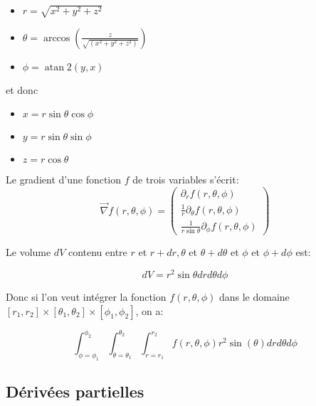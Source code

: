 \begin{itemize}
    \item $r=\sqrt{x^2+y^2+z^2}$
    \item $\theta=\arccos \left(\frac{z}{\sqrt{\left(x^2+y^2+z^2\right)}}\right)$
    \item $\phi=\operatorname{atan} 2(y, x)$
\end{itemize}
et donc 
\begin{itemize}
    \item $x=r \sin \theta \cos \phi$
    \item $y=r \sin \theta \sin \phi$
    \item $z=r \cos \theta$
\end{itemize}

Le gradient d'une fonction $f$ de trois variables s'écrit:
$$
\vec{\nabla} f(r, \theta, \phi)=\left(\begin{array}{c}
\partial_r f(r, \theta, \phi) \\
\frac{1}{r} \partial_\theta f(r, \theta, \phi) \\
\frac{1}{r \sin \theta} \partial_\phi f(r, \theta, \phi)
\end{array}\right)
$$

Le volume $d V$ contenu entre $r$ et $r+d r, \theta$ et $\theta+d \theta$ et $\phi$ et $\phi+d \phi$ est:

$$
d V=r^2 \sin \theta d r d \theta d \phi
$$


Donc si l'on veut intégrer la fonction $f(r, \theta, \phi)$ dans le domaine $\left[r_1, r_2\right] \times\left[\theta_1, \theta_2\right] \times \left[\phi_1, \phi_2\right]$, on a:

$$
\int_{\phi=\phi_1}^{\phi_2} \int_{\theta=\theta_1}^{\theta_2} \int_{r=r_1}^{r_2} f(r, \theta, \phi) r^2 \sin (\theta) d r d \theta d \phi
$$

\subsection{Dérivées partielles}



